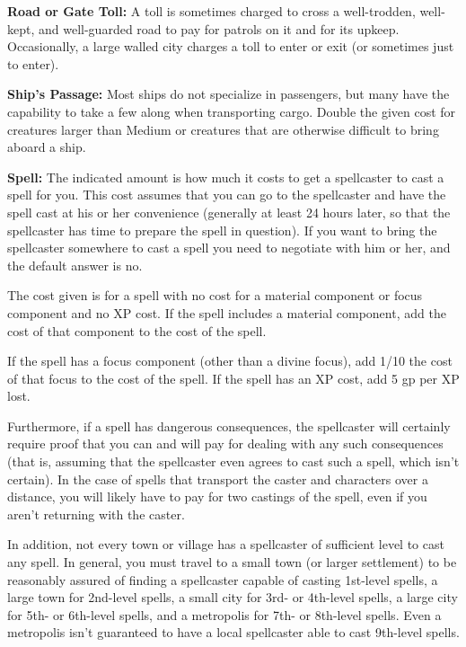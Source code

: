 \documentclass{article}
\begin{document}
\textbf{Road or Gate Toll:} A toll is sometimes charged to cross a well-trodden, 
well-kept, and well-guarded road to pay for patrols on it and for its upkeep. Occasionally, 
a large walled city charges a toll to enter or exit (or sometimes just to enter).

\textbf{Ship's Passage:} Most ships do not specialize in passengers, but many have 
the capability to take a few along when transporting cargo. Double the given cost 
for creatures larger than Medium or creatures that are otherwise difficult to bring 
aboard a ship.

\textbf{Spell: }The indicated amount is how much it costs to get a spellcaster 
to cast a spell for you. This cost assumes that you can go to the spellcaster and 
have the spell cast at his or her convenience (generally at least 24 hours later, 
so that the spellcaster has time to prepare the spell in question). If you want 
to bring the spellcaster somewhere to cast a spell you need to negotiate with him 
or her, and the default answer is no.

The cost given is for a spell with no cost for a material component or focus component 
and no XP cost. If the spell includes a material component, add the cost of that 
component to the cost of the spell.

If the spell has a focus component (other than a divine focus), add 1/10 the cost 
of that focus to the cost of the spell. If the spell has an XP cost, add 5 gp per 
XP lost. 

Furthermore, if a spell has dangerous consequences, the spellcaster will certainly 
require proof that you can and will pay for dealing with any such consequences 
(that is, assuming that the spellcaster even agrees to cast such a spell, which 
isn't certain). In the case of spells that transport the caster and characters 
over a distance, you will likely have to pay for two castings of the spell, even 
if you aren't returning with the caster.

In addition, not every town or village has a spellcaster of sufficient level to 
cast any spell. In general, you must travel to a small town (or larger settlement) 
to be reasonably assured of finding a spellcaster capable of casting 1st-level 
spells, a large town for 2nd-level spells, a small city for 3rd- or 4th-level spells, 
a large city for 5th- or 6th-level spells, and a metropolis for 7th- or 8th-level 
spells. Even a metropolis isn't guaranteed to have a local spellcaster able to 
cast 9th-level spells.

\newpage
\end{document}
